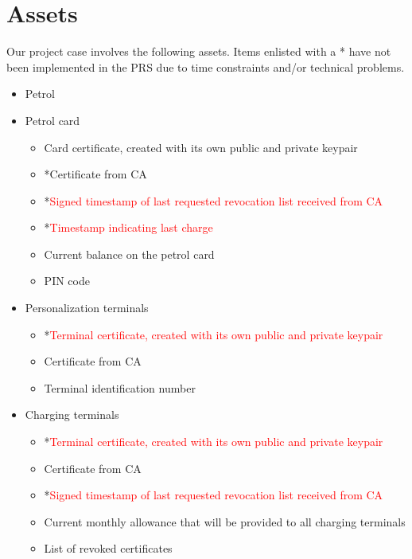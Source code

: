 \section{Assets}
Our project case involves the following assets. Items enlisted with a * have not been implemented in the PRS due to time constraints and/or technical problems.
\begin{itemize}
\item Petrol

\item Petrol card
\begin{itemize}
 \item Card certificate, created with its own public and private keypair
 \item *Certificate from CA
 \item *\textcolor{red}{Signed timestamp of last requested revocation list received from CA}
 \item *\textcolor{red}{Timestamp indicating last charge}
 \item Current balance on the petrol card
 \item PIN code
\end{itemize}

 \item Personalization terminals
 \begin{itemize}
 \item *\textcolor{red}{Terminal certificate, created with its own public and private keypair}
 \item Certificate from CA
 \item Terminal identification number
 \end{itemize}
 
 \item Charging terminals
 \begin{itemize}
    \item *\textcolor{red}{Terminal certificate, created with its own public and private keypair}
   	\item Certificate from CA
   	\item *\textcolor{red}{Signed timestamp of last requested revocation list received from CA}
 	\item Current monthly allowance that will be provided to all charging terminals
	\item List of revoked certificates
 \end{itemize}


\end{itemize}
